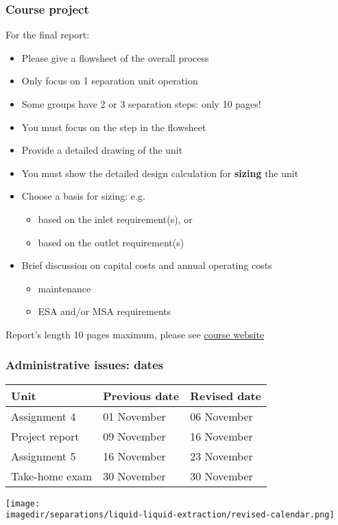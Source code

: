 	
\begin{frame}\frametitle{Course project}
	{\color{myGreen}{You should have all received feedback from me, via Google Docs}}
	
	\vspace{6pt}
	For the final report:
	\begin{itemize}
		\item	Please give a flowsheet of the overall process
		\item	Only focus on 1 separation unit operation
		\item	Some groups have 2 or 3 separation steps: only 10 pages!
		\item	You must focus on the {} step in the flowsheet
		\item	Provide a detailed drawing of the unit
		\item	You must show the detailed design calculation for \textbf{sizing} the unit		
		\item	Choose a basis for sizing: e.g.
			\begin{itemize}
				\item	based on the inlet requirement(s), or
				\item	based on the outlet requirement(s)
			\end{itemize}
		\item	Brief discussion on capital costs and annual operating costs
		\begin{itemize}
			\item	maintenance 
			\item	ESA and/or MSA requirements
		\end{itemize}
	\end{itemize}
	\begin{exampleblock}{Report's length}
		10 pages maximum, please see \href{http://learnche.mcmaster.ca/4M3/Course_project_-_2012}{course website}
	\end{exampleblock}
\end{frame}

\begin{frame}\frametitle{Administrative issues: dates}
	\begin{tabular}{lll}
		\textbf{Unit}		& 	\textbf{Previous date} 	&	\textbf{Revised date}\\ \hline
		Assignment 4		&	01 November				&	06 November\\
		Project report		&  	09 November				&   16 November\\
		Assignment 5		&	16 November			    & 	23 November\\
		Take-home exam 		&  	30 November				& 	30 November
	\end{tabular}
	\begin{center}
		\texttt{[image: \\imagedir/separations/liquid-liquid-extraction/revised-calendar.png]}
	\end{center}
\end{frame}

